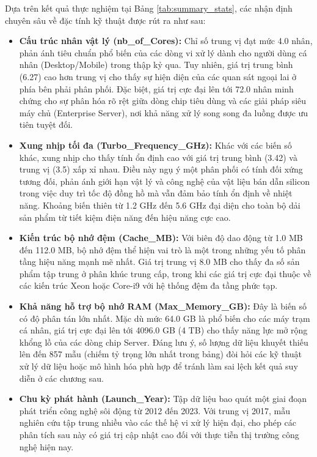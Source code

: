 \documentclass[12pt, a4paper]{article}
\begin{document}
Dựa trên kết quả thực nghiệm tại Bảng \ref{tab:summary_stats}, các nhận định chuyên sâu về đặc tính kỹ thuật được rút ra như sau:
\begin{itemize}
    \item \textbf{Cấu trúc nhân vật lý (nb\_of\_Cores):} Chỉ số trung vị đạt mức 4.0 nhân, phản ánh tiêu chuẩn phổ biến của các dòng vi xử lý dành cho người dùng cá nhân (Desktop/Mobile) trong thập kỷ qua. Tuy nhiên, giá trị trung bình (6.27) cao hơn trung vị cho thấy sự hiện diện của các quan sát ngoại lai ở phía bên phải phân phối. Đặc biệt, giá trị cực đại lên tới 72.0 nhân minh chứng cho sự phân hóa rõ rệt giữa dòng chip tiêu dùng và các giải pháp siêu máy chủ (Enterprise Server), nơi khả năng xử lý song song đa luồng được ưu tiên tuyệt đối.
    \item \textbf{Xung nhịp tối đa (Turbo\_Frequency\_GHz):} Khác với các biến số khác, xung nhịp cho thấy tính ổn định cao với giá trị trung bình (3.42) và trung vị (3.5) xấp xỉ nhau. Điều này ngụ ý một phân phối có tính đối xứng tương đối, phản ánh giới hạn vật lý và công nghệ của vật liệu bán dẫn silicon trong việc duy trì tốc độ đồng hồ mà vẫn đảm bảo tính ổn định về nhiệt năng. Khoảng biến thiên từ 1.2 GHz đến 5.6 GHz đại diện cho toàn bộ dải sản phẩm từ tiết kiệm điện năng đến hiệu năng cực cao.   
    \item \textbf{Kiến trúc bộ nhớ đệm (Cache\_MB):} Với biên độ dao động từ 1.0 MB đến 112.0 MB, bộ nhớ đệm thể hiện vai trò là một trong những yếu tố phân tầng hiệu năng mạnh mẽ nhất. Giá trị trung vị 8.0 MB cho thấy đa số sản phẩm tập trung ở phân khúc trung cấp, trong khi các giá trị cực đại thuộc về các kiến trúc Xeon hoặc Core-i9 với hệ thống đệm đa tầng phức tạp.
    \item \textbf{Khả năng hỗ trợ bộ nhớ RAM (Max\_Memory\_GB):} Đây là biến số có độ phân tán lớn nhất. Mặc dù mức 64.0 GB là phổ biến cho các máy trạm cá nhân, giá trị cực đại lên tới 4096.0 GB (4 TB) cho thấy năng lực mở rộng khổng lồ của các dòng chip Server. Đáng lưu ý, số lượng dữ liệu khuyết thiếu lên đến 857 mẫu (chiếm tỷ trọng lớn nhất trong bảng) đòi hỏi các kỹ thuật xử lý dữ liệu hoặc mô hình hóa phù hợp để tránh làm sai lệch kết quả suy diễn ở các chương sau.
    \item \textbf{Chu kỳ phát hành (Launch\_Year):} Tập dữ liệu bao quát một giai đoạn phát triển công nghệ sôi động từ 2012 đến 2023. Với trung vị 2017, mẫu nghiên cứu tập trung nhiều vào các thế hệ vi xử lý hiện đại, cho phép các phân tích sau này có giá trị cập nhật cao đối với thực tiễn thị trường công nghệ hiện nay.
\end{itemize}
\end{document}
